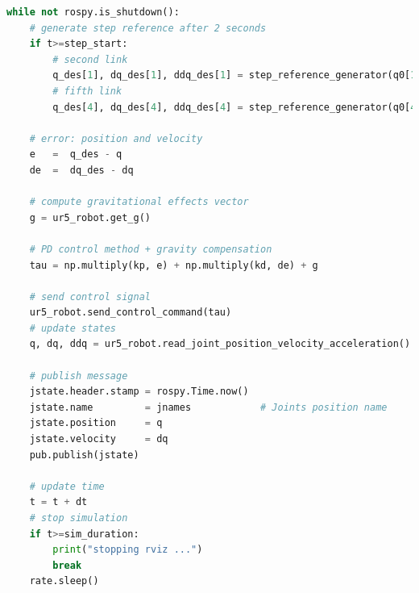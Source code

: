 \begin{lstlisting}[language=Python,caption={Move the second and fifth joint of UR5 robot with the requirement motion of activity 1.6.1}, label={lst:joint_PD_gravity_compensation_control_method_step}]
while not rospy.is_shutdown():
    # generate step reference after 2 seconds
    if t>=step_start:
        # second link
        q_des[1], dq_des[1], ddq_des[1] = step_reference_generator(q0[1], -0.4)
        # fifth link
        q_des[4], dq_des[4], ddq_des[4] = step_reference_generator(q0[4], 0.5)

    # error: position and velocity
    e 	=  q_des - q
    de 	=  dq_des - dq    
    
    # compute gravitational effects vector
    g = ur5_robot.get_g()

    # PD control method + gravity compensation
    tau = np.multiply(kp, e) + np.multiply(kd, de) + g
    
    # send control signal
    ur5_robot.send_control_command(tau)
    # update states
    q, dq, ddq = ur5_robot.read_joint_position_velocity_acceleration()

    # publish message
    jstate.header.stamp = rospy.Time.now()
    jstate.name 		= jnames			# Joints position name
    jstate.position 	= q
    jstate.velocity 	= dq
    pub.publish(jstate)

    # update time
    t = t + dt
	# stop simulation
    if t>=sim_duration:
        print("stopping rviz ...")
        break
    rate.sleep()

\end{lstlisting}

